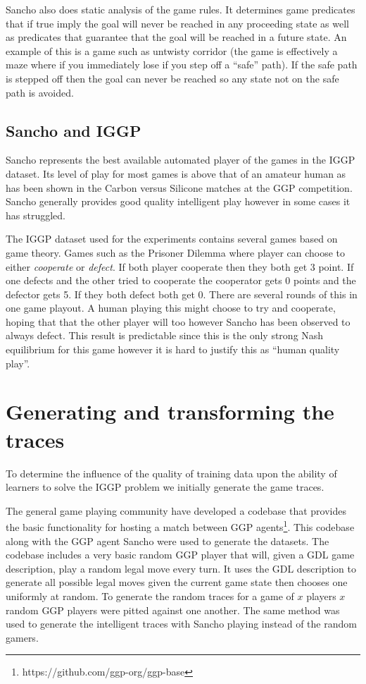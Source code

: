 Sancho also does static analysis of the game rules. It determines game predicates that if true imply the goal will never be reached in any proceeding state as well as predicates that guarantee that the goal will be reached in a future state. An example of this is a game such as untwisty corridor (the game is effectively a maze where if you immediately lose if you step off a ``safe'' path). If the safe path is stepped off then the goal can never be reached so any state not on the safe path is avoided.

\subsection{Sancho and IGGP}
Sancho represents the best available automated player of the games in the IGGP dataset. Its level of play for most games is above that of an amateur human as has been shown in the Carbon versus Silicone matches at the GGP competition\cite{Genesereth/GGPOverview}. Sancho generally provides good quality intelligent play however in some cases it has struggled.

The IGGP dataset used for the experiments contains several games based on game theory. Games such as the Prisoner Dilemma where player can choose to either \textit{cooperate} or \textit{defect}. If both player cooperate then they both get 3 point. If one defects and the other tried to cooperate the cooperator gets 0 points and the defector gets 5. If they both defect both get 0. There are several rounds of this in one game playout. A human playing this might choose to try and cooperate, hoping that that the other player will too however Sancho has been observed to always defect. This result is predictable since this is the only strong Nash equilibrium for this game however it is hard to justify this as ``human quality play''. 


\section{Generating and transforming the traces}
To determine the influence of the quality of training data upon the ability of learners to solve the IGGP problem we initially generate the game traces.

The general game playing community have developed a codebase that provides the basic functionality for hosting a match between GGP agents\footnote{https://github.com/ggp-org/ggp-base}. This codebase along with the GGP agent Sancho were used to generate the datasets. The codebase includes a very basic random GGP player that will, given a GDL game description, play a random legal move every turn. It uses the GDL description to generate all possible legal moves given the current game state then chooses one uniformly at random. To generate the random traces for a game of $x$ players $x$ random GGP players were pitted against one another. The same method was used to generate the intelligent traces with Sancho playing instead of the random gamers.

